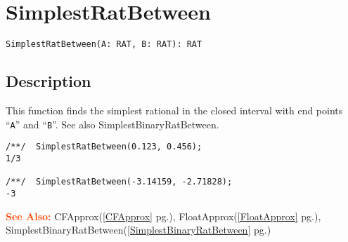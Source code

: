 \documentclass[a4paper]{mybook}
\newenvironment{command}{}{} %
\newcommand\SeeAlso{\par\textcolor{OrangeRed}{\textbf{\large See Also: }}}
\begin{document}
\section{SimplestRatBetween}
\label{SimplestRatBetween}
\begin{command} %


\begin{Verbatim}[label=syntax, rulecolor=\color{MidnightBlue},
frame=single]
SimplestRatBetween(A: RAT, B: RAT): RAT
\end{Verbatim}


\subsection*{Description}

This function finds the simplest rational in the closed interval with end
points ``\verb&A&'' and ``\verb&B&''.  See also SimplestBinaryRatBetween.
\begin{Verbatim}[label=example, rulecolor=\color{PineGreen}, frame=single]
/**/  SimplestRatBetween(0.123, 0.456);
1/3

/**/  SimplestRatBetween(-3.14159, -2.71828);
-3
\end{Verbatim}


\SeeAlso %
  CFApprox(\ref{CFApprox} pg.\pageref{CFApprox}), 
    FloatApprox(\ref{FloatApprox} pg.\pageref{FloatApprox}), 
    SimplestBinaryRatBetween(\ref{SimplestBinaryRatBetween} pg.\pageref{SimplestBinaryRatBetween})
\end{command} %
\end{document}
